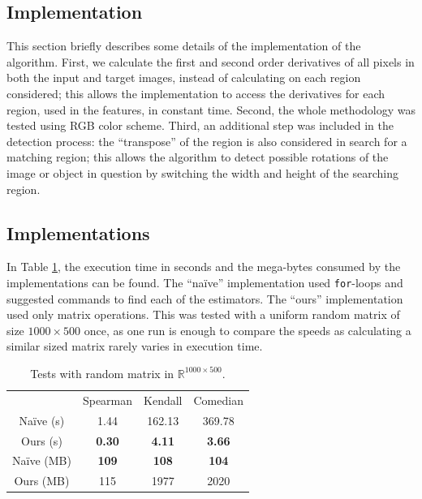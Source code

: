 \documentclass[11pt]{article}
\theoremstyle{definition}
\theoremstyle{remark}
\theoremstyle{remark}
\theoremstyle{remark}
\newcommand{\R}{{\mathbb{R}}}
\begin{document}
\subsection{Implementation}
This section briefly describes some details of the implementation of the
algorithm. First, we calculate the first and second order derivatives of all
pixels in both the input and target images, instead of calculating on each
region considered; this allows the implementation to access the derivatives for
each region, used in the features, in constant time. Second, the whole
methodology was tested using RGB color scheme. Third, an additional step was
included in the detection process: the ``transpose'' of the region is also
considered in search for a matching region; this allows the algorithm to detect
possible rotations of the image or object in question by switching the width and
height of the searching region.

\subsection{Implementations}
In Table \ref{tab:times}, the execution time in seconds and the mega-bytes
consumed by the implementations can be found. The ``naïve'' implementation used
\texttt{for}-loops and suggested commands to find each of the estimators. The
``ours'' implementation used only matrix operations. This was tested with a
uniform random matrix of size $1000\times 500$ once, as one run is enough to
compare the speeds as calculating a similar sized matrix rarely varies in
execution time.
%
\begin{table}[H]
  \centering
  \begin{tabular}{cccc}
    \hline
    & Spearman      & Kendall       & Comedian      \\
    Na\"ive (s)  & 1.44          & 162.13        & 369.78        \\
    Ours (s)   & \textbf{0.30} & \textbf{4.11} & \textbf{3.66} \\
    Na\"ive (MB) & \textbf{109}  & \textbf{108}  & \textbf{104}  \\
    Ours (MB)  & 115           & 1977          & 2020    \\     \hline
  \end{tabular}
  \caption{Tests with random matrix in $\R^{1000\times500}$.}
  \label{tab:times}
\end{table}
\end{document}
